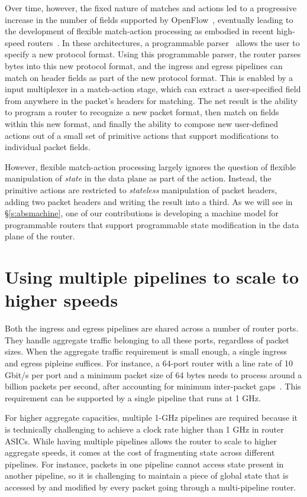 Over time, however, the fixed nature of matches and actions led to a
progressive increase in the number of fields supported by OpenFlow~\cite{p4},
eventually leading to the development of flexible match-action processing as
embodied in recent high-speed routers~\cite{rmt, xpliant, flexpipe, tofino}. In
these architectures, a programmable parser~\cite{gibb_parsing} allows the user
to specify a new protocol format. Using this programmable parser, the router
parses bytes into this new protocol format, and the ingress and egress
pipelines can match on header fields as part of the new protocol format. This
is enabled by a input multiplexer in a match-action stage, which can extract a
user-specified field from anywhere in the packet's headers for matching. The
net result is the ability to program a router to recognize a new packet format,
then match on fields within this new format, and finally the ability to compose
new user-defined actions out of a small set of primitive actions that support
modifications to individual packet fields.

However, flexible match-action processing largely ignores the question of
flexible manipulation of {\em state} in the data plane as part of the action.
Instead, the primitive actions are restricted to {\em stateless} manipulation
of packet headers, \eg adding two packet headers and writing the result into a
third. As we will see in \S\ref{s:absmachine}, one of our contributions is
developing a machine model for programmable routers that support programmable
state modification in the data plane of the router. 

\section{Using multiple pipelines to scale to higher speeds}
Both the ingress and egress pipelines are shared across a number of router
ports.  They handle aggregate traffic belonging to all these ports, regardless
of packet sizes. When the aggregate traffic requirement is small enough, a
single ingress and egress pipleine suffices. For instance, a 64-port router
with a line rate of 10 Gbit/s per port and a minimum packet size of 64 bytes
needs to process around a billion packets per second, after accounting for
minimum inter-packet gaps~\cite{rmt}.  This requirement can be supported by a
single pipeline that runs at 1 GHz.

For higher aggregate capacities, multiple 1-GHz pipelines are required because
it is technically challenging to achieve a clock rate higher than 1 GHz in
router ASICs. While having multiple pipelines allows the router to scale to
higher aggregate speeds, it comes at the cost of fragmenting state across
different pipelines.  For instance, packets in one pipeline cannot access state
present in another pipeline, so it is challenging to maintain a piece of global
state that is accessed by and modified by every packet going through a
multi-pipeline router.

